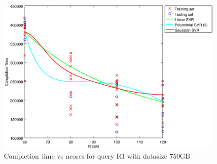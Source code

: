 
\begin {figure}[hbtp]
\centering
\includegraphics[width=\textwidth]{output/R1_750_ONLY_1_OVER_NCORES/plot_R1_750_bestmodels.eps}
\caption{Completion time vs ncores for query R1 with datasize 750GB}
\label{fig:all_nonlinear_R1_750}
\end {figure}
